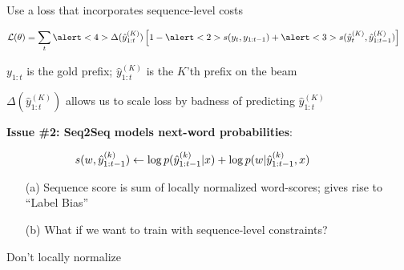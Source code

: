 \documentclass{beamer}
\let\tempone\itemize
\let\temptwo\enditemize
\renewenvironment{itemize}{\tempone\addtolength{\itemsep}{0.5\baselineskip}}{\temptwo}
\newcommand{\air}{\vspace{0.25cm}}
\newcommand{\niceq}{\ensuremath{\,{=}\,}}
\begin{document}
\begin{frame}
  \begin{center}
    \textbf{} Use a loss that incorporates sequence-level
    costs
  \end{center}
\begin{align*}
 \mathcal{L}&(\theta) = \sum_{t} \alert<4>{\Delta(\hat{y}_{1:t}^{(K)})} \left[1  - \alert<2>{s(y_t, y_{1:t-1})} +  \alert<3>{s(\hat{y}_t^{(K)}, \hat{y}_{1:t-1}^{(K)})} \right] 
\end{align*}

\begin{itemize}
\item $y_{1:t}$ is the gold prefix; $\hat{y}_{1:t}^{(K)}$ is the $K$'th prefix on the beam
\air 
\air
\item $\Delta(\hat{y}_{1:t}^{(K)})$ allows us to scale loss by badness of predicting $\hat{y}_{1:t}^{(K)}$
 
\end{itemize}
\end{frame}


\begin{frame}
  \begin{center}
    \textbf{\alert{Issue \#2}: Seq2Seq models next-word probabilities}:
  \end{center}
\air
\begin{align*}
\hspace*{-1cm} s(w, \hat{y}_{1:t-1}^{(k)}) \gets \log p(\hat{y}^{(k)}_{1:t-1}| x) + \log p( w | \hat{y}^{(k)}_{1:t-1}, x) 
\end{align*}

\begin{enumerate}
\item[(a)] Sequence score is sum of locally normalized word-scores; gives rise to ``Label Bias''~\citep{lafferty01conditional}
\air
\item[(b)] What if we want to train with sequence-level constraints?
\end{enumerate}

\air
\air
\air
\pause
\textbf{} Don't locally normalize
\end{frame}
\end{document}
